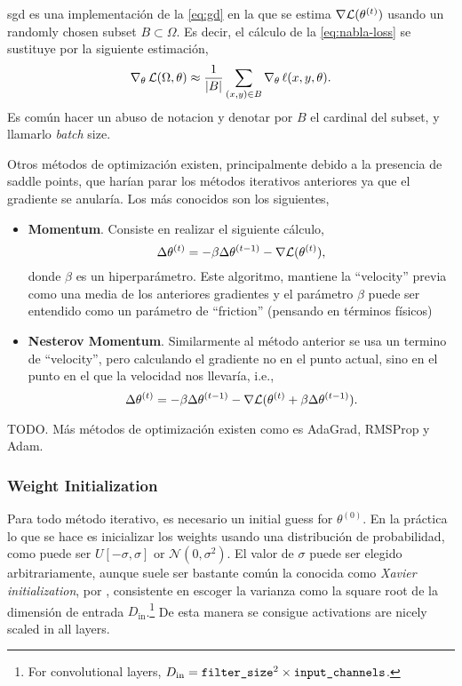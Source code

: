 \gls{sgd} es una implementación de la \vref{eq:gd} en la que se estima
\(\nabla\mathcal{L}(\theta^{(t)})\) usando un randomly chosen subset
\(B \subset \Omega\). Es decir, el cálculo de la \vref{eq:nabla-loss} se
sustituye por la siguiente estimación,
\begin{equation} \label{eq:nabla-loss-sto}
  \nabla_{\theta}\,\mathcal{L}(\Omega, \theta) \approx
  \frac{1}{\lvert B\rvert} \sum_{(x, y) \in B} \nabla_{\theta}\,\ell (x, y, \theta).
\end{equation}
Es común hacer un abuso de notacion y denotar por \(B\) el cardinal del subset,
y llamarlo \emph{batch} size.

Otros métodos de optimización existen, principalmente debido a la presencia de
saddle points, que harían parar los métodos iterativos anteriores ya que el
gradiente se anularía. Los más conocidos son los siguientes,
\begin{itemize}
  \item \textbf{Momentum}. Consiste en realizar el siguiente
  cálculo,
  \begin{equation}
    \Delta\theta^{(t)} =
    -\beta\Delta\theta^{(t-1)} -\nabla\mathcal{L}(\theta^{(t)}),
  \end{equation}
  donde \(\beta\) es un hiperparámetro. Este algoritmo, mantiene la
  ``velocity'' previa como una media de los anteriores gradientes y el
  parámetro \(\beta\) puede ser entendido como un parámetro de ``friction''
  (pensando en términos físicos)
  \item \textbf{Nesterov Momentum}. Similarmente al
  método anterior se usa un termino de ``velocity'', pero calculando el
  gradiente no en el punto actual, sino en el punto en el que la velocidad nos
  llevaría, i.e.,
    \begin{equation}
    \Delta\theta^{(t)} =
    -\beta\Delta\theta^{(t-1)} -\nabla\mathcal{L}(\theta^{(t)} +
    \beta\Delta\theta^{(t-1)}).
  \end{equation}
\end{itemize}

TODO. Más métodos de optimización existen como es AdaGrad, RMSProp y Adam.

\subsubsection{Weight Initialization}
Para todo método iterativo, es necesario un initial guess for
\(\theta^{(0)}\). En la práctica lo que se hace es inicializar los weights
usando una distribución de probabilidad, como puede ser \(U[-\sigma, \sigma]\)
or \(\mathcal{N}(0, \sigma^2)\). El valor de \(\sigma\) puede ser elegido
arbitrariamente, aunque suele ser bastante común la conocida como \emph{Xavier
  initialization}, por , consistente en escoger la
varianza como la square root de la dimensión de entrada
\(D_{\text{in}}\).\footnote{For convolutional layers,
  \(D_{\text{in}} = \text{\texttt{filter\_size}}^2 \times
  \text{\texttt{input\_channels}}\).} De esta manera se consigue activations are
nicely scaled in all layers.

